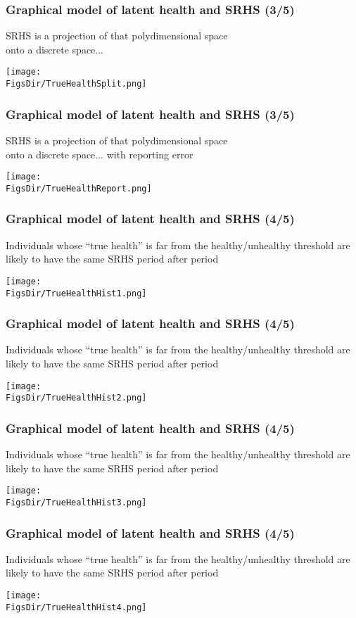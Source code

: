 \documentclass[aspectratio=169]{beamer}
\newcommand{\FigsDir}{../Figures}
\begin{document}
\begin{frame}\frametitle{Graphical model of latent health and SRHS (3/5)}
SRHS is a projection of that polydimensional space \\ onto a discrete space...
\begin{center}
	\texttt{[image: \\FigsDir/TrueHealthSplit.png]}
\end{center}
\end{frame}

\begin{frame}\frametitle{Graphical model of latent health and SRHS (3/5)}
SRHS is a projection of that polydimensional space \\ onto a discrete space... with reporting error
\begin{center}
	\texttt{[image: \\FigsDir/TrueHealthReport.png]}
\end{center}
\end{frame}


\begin{frame}\frametitle{Graphical model of latent health and SRHS (4/5)}
Individuals whose ``true health'' is far from the healthy/unhealthy threshold are likely to have the same SRHS period after period
\begin{center}
	\texttt{[image: \\FigsDir/TrueHealthHist1.png]}
\end{center}
\end{frame}

\begin{frame}\frametitle{Graphical model of latent health and SRHS (4/5)}
Individuals whose ``true health'' is far from the healthy/unhealthy threshold are likely to have the same SRHS period after period
\begin{center}
	\texttt{[image: \\FigsDir/TrueHealthHist2.png]}
\end{center}
\end{frame}

\begin{frame}\frametitle{Graphical model of latent health and SRHS (4/5)}
Individuals whose ``true health'' is far from the healthy/unhealthy threshold are likely to have the same SRHS period after period
\begin{center}
	\texttt{[image: \\FigsDir/TrueHealthHist3.png]}
\end{center}
\end{frame}

\begin{frame}\frametitle{Graphical model of latent health and SRHS (4/5)}
Individuals whose ``true health'' is far from the healthy/unhealthy threshold are likely to have the same SRHS period after period
\begin{center}
	\texttt{[image: \\FigsDir/TrueHealthHist4.png]}
\end{center}
\end{frame}
\end{document}
